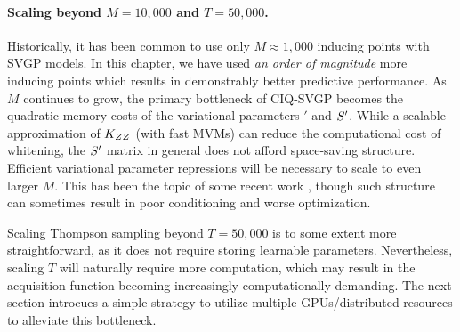 \paragraph{Scaling beyond $M=10,\!000$ and $T=50,\!000$.}
Historically, it has been common to use only $M\approx1,\!000$ inducing points with SVGP models.
In this chapter, we have used \emph{an order of magnitude} more inducing points which results in demonstrably better predictive performance.
As $M$ continues to grow, the primary bottleneck of CIQ-SVGP becomes the quadratic memory costs of the variational parameters $\bm'$ and $S'$.
While a scalable approximation of $K_{ZZ}$ (with fast MVMs) can reduce the computational cost of whitening, the $S'$ matrix in general does not afford space-saving structure.
Efficient variational parameter repressions will be necessary to scale to even larger $M$.
This has been the topic of some recent work \cite{wilson2016stochastic,cheng2017variational,salimbeni2018orthogonally,shi2019sparse}, though such structure can sometimes result in poor conditioning and worse optimization.

Scaling Thompson sampling beyond $T=50,\!000$ is to some extent more straightforward, as it does not require storing learnable parameters.
Nevertheless, scaling $T$ will naturally require more computation, which may result in the acquisition function becoming increasingly computationally demanding.
The next section introcues a simple strategy to utilize multiple GPUs/distributed resources to alleviate this bottleneck.
